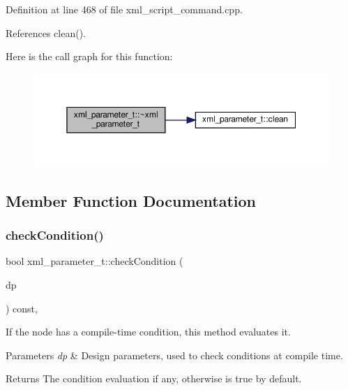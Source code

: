 Definition at line 468 of file xml\+\_\+script\+\_\+command.\+cpp.



References clean().

Here is the call graph for this function\+:
\nopagebreak
\begin{figure}[H]
\begin{center}
\leavevmode
\includegraphics[width=350pt]{d4/dfd/classxml__parameter__t_af7b5e493a443865d557b36082b5ab4a7_cgraph}
\end{center}
\end{figure}


\subsection{Member Function Documentation}
\mbox{\label{classxml__parameter__t_a3ba5d8470dadb8afd334dfbaba43c05f}} 
\subsubsection{\texorpdfstring{check\+Condition()}{checkCondition()}}
{\footnotesize\ttfamily bool xml\+\_\+parameter\+\_\+t\+::check\+Condition (\begin{DoxyParamCaption}\item[{const \hyperlink{DesignParameters_8hpp_ae36bb1c4c9150d0eeecfe1f96f42d157}{Design\+Parameters\+Ref} \&}]{dp }\end{DoxyParamCaption}) const\hspace{0.3cm}{\ttfamily [override]}, {\ttfamily [virtual]}}



If the node has a compile-\/time condition, this method evaluates it. 


\begin{DoxyParams}{Parameters}
{\em dp} & Design parameters, used to check conditions at compile time. \\
\hline
\end{DoxyParams}
\begin{DoxyReturn}{Returns}
The condition evaluation if any, otherwise is true by default. 
\end{DoxyReturn}


